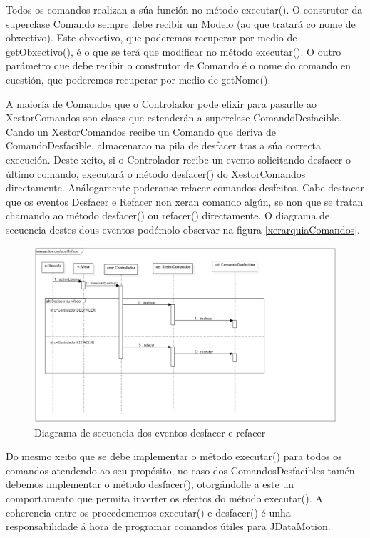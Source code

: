Todos os comandos realizan a súa función no método executar(). O construtor da superclase Comando sempre debe recibir un Modelo (ao que tratará co nome de obxectivo). Este obxectivo, que poderemos recuperar por medio de getObxectivo(), é o que se terá que modificar no método executar(). O outro parámetro que debe recibir o construtor de Comando é o nome do comando en cuestión, que poderemos recuperar por medio de getNome().

A maioría de Comandos que o Controlador pode elixir para pasarlle ao XestorComandos son clases que estenderán a superclase ComandoDesfacible. Cando un XestorComandos recibe un Comando que deriva de ComandoDesfacible, almacenarao na pila de desfacer tras a súa correcta execución. Deste xeito, si o Controlador recibe un evento solicitando desfacer o último comando, executará o método desfacer() do XestorComandos directamente. Análogamente poderanse refacer comandos desfeitos. Cabe destacar que os eventos Desfacer e Refacer non xeran comando algún, se non que se tratan chamando ao método desfacer() ou refacer() directamente. O diagrama de secuencia destes dous eventos podémolo observar na figura \ref{xerarquiaComandos}.

\begin{figure}
\centering
\includegraphics[width=\textwidth,height=\textheight,keepaspectratio]{figuras/desfacerRefacer}
\caption{Diagrama de secuencia dos eventos desfacer e refacer}
\label{desfacerRefacer}
\end{figure}

Do mesmo xeito que se debe implementar o método executar() para todos os comandos atendendo ao seu propósito, no caso dos ComandosDesfacibles tamén debemos implementar o método desfacer(), otorgándolle a este un comportamento que permita inverter os efectos do método executar(). A coherencia entre os procedementos executar() e desfacer() é unha responsabilidade á hora de programar comandos útiles para JDataMotion.

